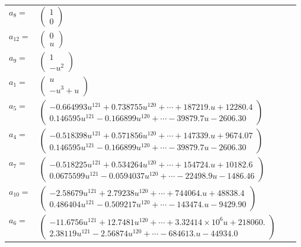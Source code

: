 \documentclass[1p]{elsarticle_modified}
\theoremstyle{definition}
\begin{document}
\begin{tabular}{m{7pt} m{180pt} m{7pt} m{180pt} }
\flushright $a_{8}=$&$\begin{pmatrix}1\\0\end{pmatrix}$ \\
\flushright $a_{12}=$&$\begin{pmatrix}0\\u\end{pmatrix}$ \\
\flushright $a_{9}=$&$\begin{pmatrix}1\\- u^2\end{pmatrix}$ \\
\flushright $a_{1}=$&$\begin{pmatrix}u\\- u^3+u\end{pmatrix}$ \\
\flushright $a_{5}=$&$\begin{pmatrix}-0.664993 u^{121}+0.738755 u^{120}+\cdots+187219. u+12280.4\\0.146595 u^{121}-0.166899 u^{120}+\cdots-39879.7 u-2606.30\end{pmatrix}$ \\
\flushright $a_{4}=$&$\begin{pmatrix}-0.518398 u^{121}+0.571856 u^{120}+\cdots+147339. u+9674.07\\0.146595 u^{121}-0.166899 u^{120}+\cdots-39879.7 u-2606.30\end{pmatrix}$ \\
\flushright $a_{7}=$&$\begin{pmatrix}-0.518225 u^{121}+0.534264 u^{120}+\cdots+154724. u+10182.6\\0.0675599 u^{121}-0.0594037 u^{120}+\cdots-22498.9 u-1486.46\end{pmatrix}$ \\
\flushright $a_{10}=$&$\begin{pmatrix}-2.58679 u^{121}+2.79238 u^{120}+\cdots+744064. u+48838.4\\0.486404 u^{121}-0.509217 u^{120}+\cdots-143474. u-9429.90\end{pmatrix}$ \\
\flushright $a_{6}=$&$\begin{pmatrix}-11.6756 u^{121}+12.7481 u^{120}+\cdots+3.32414\times10^{6} u+218060.\\2.38119 u^{121}-2.56874 u^{120}+\cdots-684613. u-44934.0\end{pmatrix}$ \\

\end{tabular}
\end{document}
